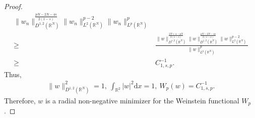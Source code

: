 \documentclass[12pt,a4paper,reqno]{amsart}
\numberwithin{equation}{section}
\begin{document}
\begin{proof}
\begin{equation*}
\begin{aligned}
{\|w_{n}\|_{D^{1,2}(\mathbb{R}^{N})}^{\frac{pN-2N-4s}{2(1-s)}}
\|w_{n}\|_{L^{2}(\mathbb{R}^{N})}^{p-2}
}
{\|w_{n}\|_{L^{p}(\mathbb{R}^{N})}^{p}}\\
\geqslant&
\frac
{
\|w\|_{D^{s,2}(\mathbb{R}^{N})}^{\frac{2N+4-pN}{2(1-s)}}
\|w\|_{D^{1,2}(\mathbb{R}^{N})}^{\frac{pN-2N-4s}{2(1-s)}}
\|w\|_{L^{2}(\mathbb{R}^{N})}^{p-2}
}
{\|w\|_{L^{p}(\mathbb{R}^{N})}^{p}}\\
\geqslant&
C_{1,s,p}^{-1}.
\end{aligned}
\end{equation*}
Thus,
\begin{equation*}
\begin{aligned}
\|w\|_{D^{1,2}(\mathbb{R}^{N})}^{2}=1,~ \int_{\mathbb{R}^{2}}|w|^{2}\mathrm{d}x=1,~
W_{p}(w)=C_{1,s,p}^{-1}.
\end{aligned}
\end{equation*}
Therefore, $w$ is a radial non-negative minimizer for the Weinstein functional $W_{p}$.


\end{proof}
\end{document}
